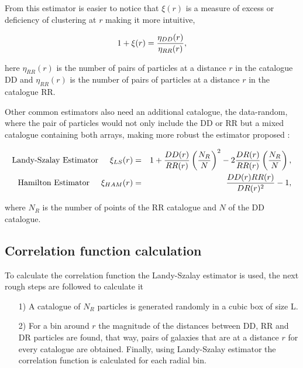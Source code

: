 From this estimator is easier to notice that $\xi(r)$ is a measure of 
excess or deficiency of clustering at $r$ making it more intuitive, 

\[1+\xi(r)= \frac{\eta_{DD}(r)}{\eta_{RR}(r)} ,\]

here $\eta_{RR}(r)$ is the number of pairs of particles at a distance $r$ in the catalogue DD 
and $\eta_{RR}(r)$ is the number of pairs of particles at a distance $r$ in the catalogue RR. 

Other common estimators also need an additional catalogue, the data-random, where the
pair of particles would not only include the DD or RR but a mixed catalogue containing 
both arrays, making more robust the estimator proposed \cite{Est_CF}:

\begin{eqnarray}
\mbox{Landy-Szalay Estimator}\hspace{0.5cm} \xi_{LS}(r)&=& 1+\frac{DD(r)}{RR(r)}\left(\frac{N_R}{N}\right)^2-2\frac{DR(r)}{RR(r)}\left(\frac{N_R}{N}\right) , \nonumber \\
\mbox{Hamilton Estimator}  \hspace{0.5cm} \xi_{HAM}(r)&=&\frac{DD(r)RR(r)}{DR(r)^2}-1 , \nonumber 
\end{eqnarray}

where $N_R$ is the number of points of the RR catalogue and $N$ of the DD catalogue.

\subsection{Correlation function calculation}

To calculate the correlation function the Landy-Szalay estimator is used, the next
rough steps are followed to calculate it

\begin{enumerate}

\item[1)] A catalogue of $N_R$ particles is generated randomly in a cubic box of size L.

\item[2)] For a bin around $r$ the magnitude of the distances between DD, RR and DR
particles are found, that way, pairs of galaxies that are at a distance $r$ for every 
catalogue are obtained. Finally, using Landy-Szalay estimator the correlation function 
is calculated for each radial bin. 

\end{enumerate}
